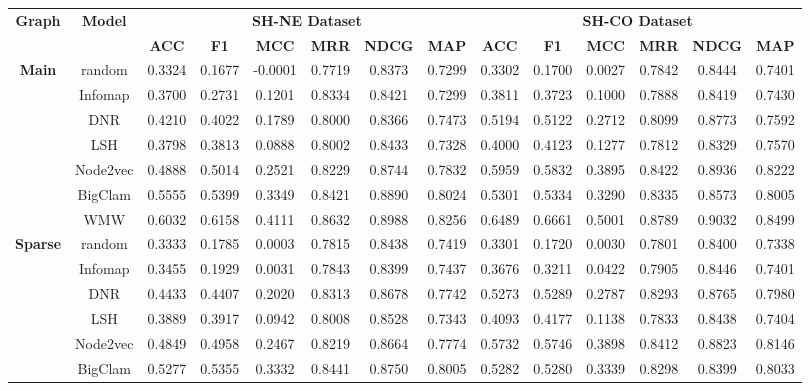 \begin{table}
	
	\centering
	\renewcommand{\tabcolsep}{2.5pt}
	\begin{tabular}{|c|c|c|c|c|c|c|c|c|c|c|c|c|c|} 
		\hline
		\multirow{2}{*}{ \textbf{Graph}} & 	\multirow{2}{*}{\textbf{Model}}	&\multicolumn{6}{c|}{\textbf{SH-NE Dataset}} & \multicolumn{6}{c|}{\textbf{SH-CO Dataset}}\\
		\cline{3-14}
		& & \textbf{ACC}& \textbf{F1}& \textbf{MCC}& \textbf{MRR}& \textbf{NDCG}& \textbf{MAP} & \textbf{ACC}& \textbf{F1}& \textbf{MCC} & \textbf{MRR}& \textbf{NDCG}& \textbf{MAP} \\ \hline
		\multirow{7}{*}{\textbf{Main }} &random  & 0.3324& 0.1677&-0.0001&0.7719&0.8373&0.7299&0.3302&0.1700&0.0027&0.7842&0.8444&0.7401\\ 
		& Infomap &0.3700& 0.2731&0.1201&0.8334&0.8421&0.7299 &0.3811&0.3723&0.1000&0.7888&0.8419&0.7430\\  
		& DNR &0.4210&0.4022&0.1789&0.8000&0.8366&0.7473&0.5194&0.5122&0.2712&0.8099&0.8773&0.7592\\   
		& LSH &0.3798&0.3813&0.0888&0.8002&0.8433&0.7328&0.4000&0.4123&0.1277&0.7812&0.8329&0.7570\\ 
		& Node2vec& 0.4888 &0.5014&0.2521&0.8229&0.8744&0.7832&0.5959&0.5832&0.3895&0.8422&0.8936&0.8222\\   
		& BigClam &0.5555&0.5399&0.3349&0.8421&0.8890&0.8024&0.5301&0.5334&0.3290&0.8335&0.8573&0.8005\\ 
		& WMW &0.6032&0.6158&0.4111&0.8632&0.8988&0.8256&0.6489&0.6661&0.5001&0.8789&0.9032&0.8499\\ \hline
		\multirow{7}{*}{\textbf{Sparse}} &random  & 0.3333& 0.1785&0.0003&0.7815&0.8438&0.7419&0.3301&0.1720&0.0030&0.7801&0.8400&0.7338\\ 
		& Infomap &0.3455& 0.1929&0.0031&0.7843&0.8399&0.7437 &0.3676&0.3211&0.0422&0.7905&0.8446&0.7401\\  
		& DNR &0.4433&0.4407&0.2020&0.8313&0.8678&0.7742&0.5273&0.5289&0.2787&0.8293&0.8765&0.7980\\   
		& LSH &0.3889&0.3917&0.0942&0.8008&0.8528&0.7343&0.4093&0.4177&0.1138&0.7833&0.8438&0.7404\\ 
		& Node2vec& 0.4849 &0.4958&0.2467&0.8219&0.8664&0.7774&0.5732&0.5746&0.3898&0.8412&0.8823&0.8146\\   
		& BigClam &0.5277&0.5355&0.3332&0.8441&0.8750&0.8005&0.5282&0.5280&0.3339&0.8298&0.8399&0.8033\\ 

\end{tabular}
\end{table}
